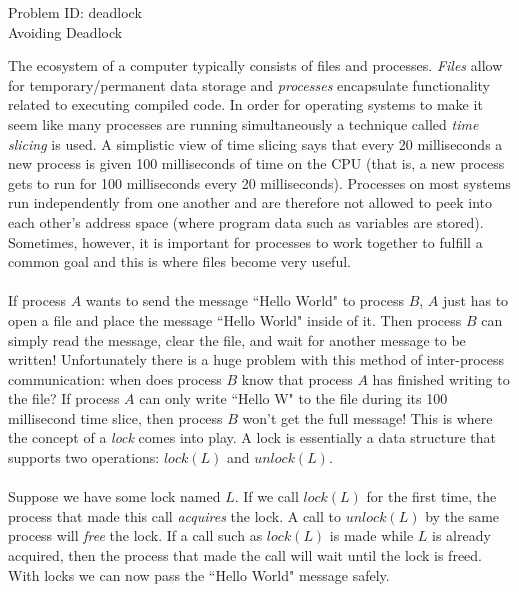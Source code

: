 \documentclass[a4paper,11pt]{article}
\begin{document}
\setcounter{page}{2}
\begin{center}
{\Huge Problem ID: deadlock}\vspace{2 mm} \\	%
{\huge Avoiding Deadlock}\vspace{2 mm} \\	%
\end{center}
\large{
The ecosystem of a computer typically consists of files and processes. \emph{Files} allow for temporary/permanent data storage and \emph{processes} encapsulate functionality related to executing compiled code. In order for operating systems to make it seem like many processes are running simultaneously a technique called \emph{time slicing} is used. A simplistic view of time slicing says that every 20 milliseconds a new process is given 100 milliseconds of time on the CPU (that is, a new process gets to run for 100 milliseconds every 20 milliseconds). Processes on most systems run independently from one another and are therefore not allowed to peek into each other's address space (where program data such as variables are stored). Sometimes, however, it is important for processes to work together to fulfill a common goal and this is where files become very useful. \\\\ 
If process $A$ wants to send the message ``Hello World" to process $B$, $A$ just has to open a file  and place the message ``Hello World" inside of it. Then process $B$ can simply read the message, clear the file, and wait for another message to be written! Unfortunately there is a huge problem with this method of inter-process communication: when does process $B$ know that process $A$ has finished writing to the file? If process $A$ can only write ``Hello W" to the file during its 100 millisecond time slice, then process $B$ won't get the full message! This is where the concept of a \emph{lock} comes into play. A lock is essentially a data structure that supports two operations: $lock(L)$ and $unlock(L)$.
\\\\
Suppose we have some lock named $L$. If we call $lock(L)$ for the first time, the process that made this call \emph{acquires} the lock. A call to $unlock(L)$ by the same process will \emph{free} the lock. If a call such as $lock(L)$ is made while $L$ is already acquired, then the process that made the call will wait until the lock is freed. With locks we can now pass the ``Hello World" message safely.
\\\\
}
\end{document}
